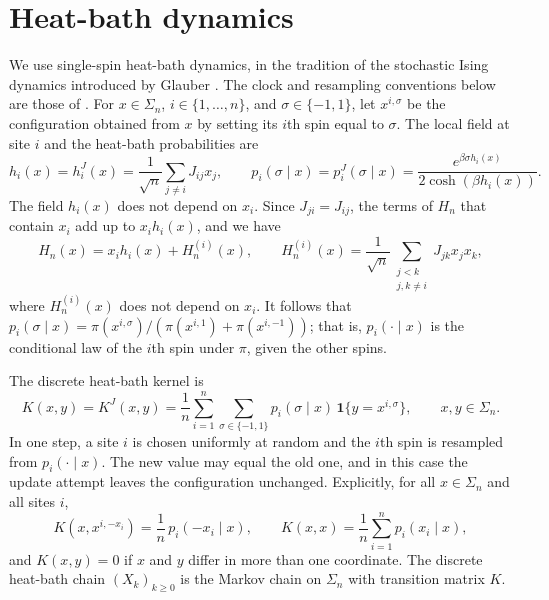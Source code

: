 \section{Heat-bath dynamics}\label{sec:model-dynamics}

We use single-spin heat-bath dynamics, in the tradition of the stochastic Ising dynamics introduced by Glauber \cite{glauber-1963}. The clock and resampling conventions below are those of \cite[Section~1, pp.~2--3]{oai-barriers}.
For $x\in\Sigma_n$, $i\in\{1,\dots,n\}$, and $\sigma\in\{-1,1\}$, let $x^{i,\sigma}$ be the configuration obtained from $x$ by setting its $i$th spin equal to $\sigma$. The local field at site $i$ and the heat-bath probabilities are
\begin{equation}\label{eq:model-heat-bath}
 h_i(x)=h_i^J(x)=\frac1{\sqrt n}\sum_{j\neq i}J_{ij}x_j,\qquad
 p_i(\sigma\mid x)=p_i^J(\sigma\mid x)=\frac{e^{\beta\sigma h_i(x)}}{2\cosh(\beta h_i(x))}.
\end{equation}
The field $h_i(x)$ does not depend on $x_i$. Since $J_{ji}=J_{ij}$, the terms of $H_n$ that contain $x_i$ add up to $x_ih_i(x)$, and we have
\begin{equation}\label{eq:model-site-split}
 H_n(x)=x_ih_i(x)+H_n^{(i)}(x),\qquad
 H_n^{(i)}(x)=\frac1{\sqrt n}\sum_{\substack{j<k\\ j,k\neq i}}J_{jk}x_jx_k,
\end{equation}
where $H_n^{(i)}(x)$ does not depend on $x_i$. It follows that $p_i(\sigma\mid x)=\pi(x^{i,\sigma})/(\pi(x^{i,1})+\pi(x^{i,-1}))$; that is, $p_i(\cdot\mid x)$ is the conditional law of the $i$th spin under $\pi$, given the other spins.

The discrete heat-bath kernel is
\begin{equation}\label{eq:common-kernel}
 K(x,y)=K^J(x,y)=\frac1n\sum_{i=1}^n\sum_{\sigma\in\{-1,1\}}p_i(\sigma\mid x)\,\mathbf 1\{y=x^{i,\sigma}\},\qquad x,y\in\Sigma_n.
\end{equation}
In one step, a site $i$ is chosen uniformly at random and the $i$th spin is resampled from $p_i(\cdot\mid x)$. The new value may equal the old one, and in this case the update attempt leaves the configuration unchanged. Explicitly, for all $x\in\Sigma_n$ and all sites $i$,
\begin{equation}\label{b:eq:discrete-kernel}
 K(x,x^{i,-x_i})=\frac1n\,p_i(-x_i\mid x),\qquad
 K(x,x)=\frac1n\sum_{i=1}^np_i(x_i\mid x),
\end{equation}
and $K(x,y)=0$ if $x$ and $y$ differ in more than one coordinate. The discrete heat-bath chain $(X_k)_{k\ge0}$ is the Markov chain on $\Sigma_n$ with transition matrix $K$.

